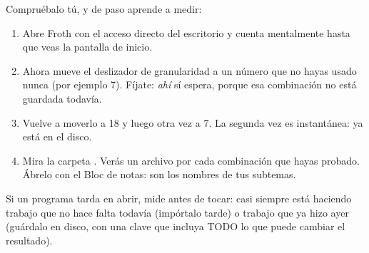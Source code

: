 \documentclass[11pt,a4paper]{article}
\begin{document}
\begin{practica}
Compruébalo tú, y de paso aprende a medir:

\begin{enumerate}
  \item Abre Froth con el acceso directo del escritorio y cuenta mentalmente hasta que
        veas la pantalla de inicio.
  \item Ahora mueve el deslizador de granularidad a un número que no hayas usado nunca
        (por ejemplo 7). Fíjate: \emph{ahí} sí espera, porque esa combinación no está
        guardada todavía.
  \item Vuelve a moverlo a 18 y luego otra vez a 7. La segunda vez es instantánea: ya
        está en el disco.
  \item Mira la carpeta . Verás
        un archivo  por cada combinación que hayas probado.
        Ábrelo con el Bloc de notas: son los nombres de tus subtemas.
\end{enumerate}
\end{practica}

\begin{resumen}
Si un programa tarda en abrir, mide antes de tocar: casi siempre está haciendo trabajo
que no hace falta todavía (impórtalo tarde) o trabajo que ya hizo ayer (guárdalo en
disco, con una clave que incluya TODO lo que puede cambiar el resultado).
\end{resumen}
\clearpage
\end{document}
